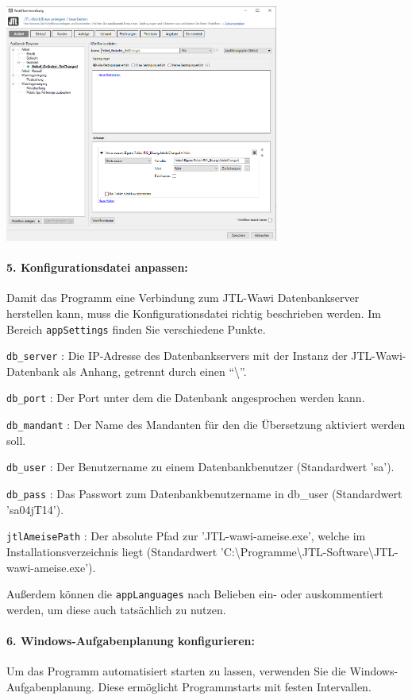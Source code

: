 \begin{center}
	\includegraphics[width=9cm]{./img/workflows.png}
\end{center}

\paragraph{5. Konfigurationsdatei anpassen:}
Damit das Programm eine Verbindung zum JTL-Wawi Datenbankserver herstellen kann, muss die Konfigurationsdatei richtig beschrieben werden.
Im Bereich \texttt{appSettings} finden Sie verschiedene Punkte. 

\texttt{db\_server} : Die IP-Adresse des Datenbankservers mit der Instanz der JTL-Wawi-Datenbank als Anhang, getrennt durch einen ``\textbackslash''.

\texttt{db\_port} : Der Port unter dem die Datenbank angesprochen werden kann.

\texttt{db\_mandant} : Der Name des Mandanten für den die Übersetzung aktiviert werden soll.

\texttt{db\_user} : Der Benutzername zu einem Datenbankbenutzer (Standardwert 'sa').

\texttt{db\_pass} : Das Passwort zum Datenbankbenutzername in db\_user (Standardwert 'sa04jT14').

\texttt{jtlAmeisePath} : Der absolute Pfad zur 'JTL-wawi-ameise.exe', welche im Installationsverzeichnis liegt (Standardwert 'C:\textbackslash Programme\textbackslash JTL-Software\textbackslash JTL-wawi-ameise.exe').

Außerdem können die \texttt{appLanguages} nach Belieben ein- oder auskommentiert werden, um diese auch tatsächlich zu nutzen.

\paragraph{6. Windows-Aufgabenplanung konfigurieren:}%
Um das Programm automatisiert starten zu lassen, verwenden Sie die Windows-Aufgabenplanung. 
Diese ermöglicht Programmstarts mit festen Intervallen.

